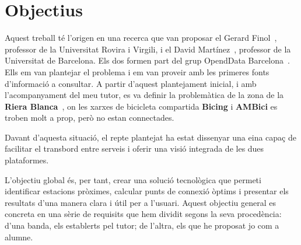 \chapter{Objectius}
\label{c:objectius}

Aquest treball té l'origen en una recerca que van proposar el Gerard Finol~\cite{gerard}, professor de la Universitat Rovira i Virgili, i el David Martínez~\cite{david}, professor de la Universitat de Barcelona. Els dos formen part del grup OpendData Barcelona~\cite{openData}. Ells em van plantejar el problema i em van proveir amb les primeres fonts d’informació a consultar. A partir d’aquest plantejament inicial, i amb l’acompanyament del meu tutor, es va definir la problemàtica de la zona de la \textbf{Riera Blanca}~\cite{riera-blanca},
on les xarxes de bicicleta compartida \textbf{Bicing} i \textbf{AMBici} es troben molt a prop, però no estan connectades.

Davant d’aquesta situació, el repte plantejat ha estat dissenyar una eina capaç de facilitar el transbord
entre serveis i oferir una visió integrada de les dues plataformes.

L’objectiu global és, per tant, crear una solució tecnològica que permeti identificar estacions pròximes,
calcular punts de connexió òptims i presentar els resultats d’una manera clara i útil per a l’usuari.
Aquest objectiu general es concreta en una sèrie de requisits que hem dividit segons la seva procedència:
d’una banda, els establerts pel tutor; de l’altra, els que he proposat jo com a alumne.


